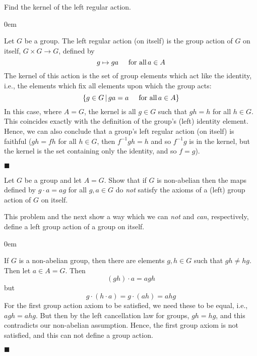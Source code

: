 \documentclass[12pt]{article}
\renewcommand{\qed}{\hfill$\blacksquare$}
\renewenvironment{proof}{\begin{addmargin}[1em]{0em}\begin{newproof}}{\end{newproof}\end{addmargin}\qed}
\newenvironment{problem}[2][Exercise]{\begin{trivlist}
\item[\hskip \labelsep {\bfseries #1}\hskip \labelsep {\bfseries #2.}]}{\end{trivlist}}
\begin{document}
\begin{problem}{1.7.13}
Find the kernel of the left regular action.
\end{problem}
\begin{proof}
Let $G$ be a group. The left regular action (on itself) is the group action of $G$ on itself, $G\times G\rightarrow G$, defined by $$ g\mapsto ga \hspace{5mm} \text{for all} \, a\in A $$ The kernel of this action is the set of group elements which act like the identity, i.e., the elements which fix all elements upon which the group acts: $$ \left\{ g\in G \, | \, ga = a \hspace{5mm} \text{for all}\, a\in A\right\} $$ In this case, where $A=G$, the kernel is all $g\in G$ such that $gh=h$ for all $h\in G$. This coincides exactly with the definition of the group's (left) identity element. Hence, we can also conclude that a group's left regular action (on itself) is faithful ($gh=fh$ for all $h\in G$, then $f^{-1}g h = h$ and so $f^{-1}g$ is in the kernel, but the kernel is the set containing only the identity, and so $f=g$).
\end{proof}




\begin{problem}{1.7.14}
Let $G$ be a group and let $A=G$. Show that if $G$ is non-abelian then the maps defined by $g\cdot a = ag$ for all $g,a\in G$ do \textit{not} satisfy the axioms of a (left) group action of $G$ on itself.
\end{problem}
{\color{red}This problem and the next show a way which we can \textit{not} and \textit{can}, respectively, define a left group action of a group on itself.}
\begin{proof}
If $G$ is a non-abelian group, then there are elements $g,h\in G$ such that $gh\neq hg$. Then let $a\in A=G$. Then
$$ \left(gh\right)\cdot a = agh$$ but
$$ g\cdot \left(h\cdot a\right) = g \cdot \left(ah\right) = ahg $$ For the first group action axiom to be satisfied, we need these to be equal, i.e., $agh=ahg$. But then by the left cancellation law for groups, $gh=hg$, and this contradicts our non-abelian assumption. Hence, the first group axiom is not satisfied, and this can not define a group action.
\end{proof}
\end{document}
